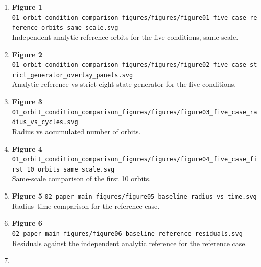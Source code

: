\documentclass[
  a4paper,
]{article}
\begin{document}
\begin{enumerate}
\def\labelenumi{\arabic{enumi}.}
\item
  \textbf{Figure 1}
  \texttt{01\_\allowbreak{}orbit\_\allowbreak{}condition\_\allowbreak{}comparison\_\allowbreak{}figures/\allowbreak{}figures/\allowbreak{}figure01\_\allowbreak{}five\_\allowbreak{}case\_\allowbreak{}reference\_\allowbreak{}orbits\_\allowbreak{}same\_\allowbreak{}scale.svg}\\
  Independent analytic reference orbits for the five conditions, same
  scale.
\item
  \textbf{Figure 2}
  \texttt{01\_\allowbreak{}orbit\_\allowbreak{}condition\_\allowbreak{}comparison\_\allowbreak{}figures/\allowbreak{}figures/\allowbreak{}figure02\_\allowbreak{}five\_\allowbreak{}case\_\allowbreak{}strict\_\allowbreak{}generator\_\allowbreak{}overlay\_\allowbreak{}panels.svg}\\
  Analytic reference vs strict eight-state generator for the five
  conditions.
\item
  \textbf{Figure 3}
  \texttt{01\_\allowbreak{}orbit\_\allowbreak{}condition\_\allowbreak{}comparison\_\allowbreak{}figures/\allowbreak{}figures/\allowbreak{}figure03\_\allowbreak{}five\_\allowbreak{}case\_\allowbreak{}radius\_\allowbreak{}vs\_\allowbreak{}cycles.svg}\\
  Radius vs accumulated number of orbits.
\item
  \textbf{Figure 4}
  \texttt{01\_\allowbreak{}orbit\_\allowbreak{}condition\_\allowbreak{}comparison\_\allowbreak{}figures/\allowbreak{}figures/\allowbreak{}figure04\_\allowbreak{}five\_\allowbreak{}case\_\allowbreak{}first\_\allowbreak{}10\_\allowbreak{}orbits\_\allowbreak{}same\_\allowbreak{}scale.svg}\\
  Same-scale comparison of the first 10 orbits.
\item
  \textbf{Figure 5}
  \texttt{02\_\allowbreak{}paper\_\allowbreak{}main\_\allowbreak{}figures/\allowbreak{}figure05\_\allowbreak{}baseline\_\allowbreak{}radius\_\allowbreak{}vs\_\allowbreak{}time.svg}\\
  Radius--time comparison for the reference case.
\item
  \textbf{Figure 6}
  \texttt{02\_\allowbreak{}paper\_\allowbreak{}main\_\allowbreak{}figures/\allowbreak{}figure06\_\allowbreak{}baseline\_\allowbreak{}reference\_\allowbreak{}residuals.svg}\\
  Residuals against the independent analytic reference for the reference
  case.
\item

\end{enumerate}
\end{document}
